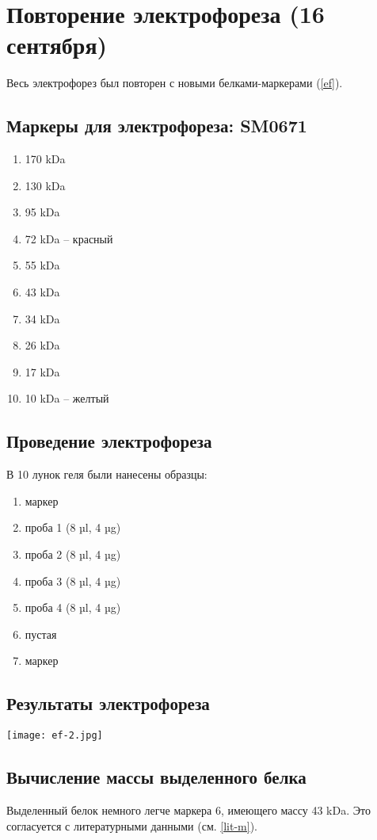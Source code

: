 \section{Повторение электрофореза (16 сентября)}

Весь электрофорез был повторен с новыми белками-маркерами (\ref{ef}).

\subsection{Маркеры для электрофореза: SM0671}
\begin{enumerate}
\item 170 kDa
\item 130 kDa
\item 95 kDa
\item 72 kDa -- красный
\item 55 kDa
\item 43 kDa
\item 34 kDa
\item 26 kDa
\item 17 kDa
\item 10 kDa -- желтый
\end{enumerate}

\subsection{Проведение электрофореза}
В 10 лунок геля были нанесены образцы:
\begin{enumerate}
\item маркер
\item проба 1 (8 µl, 4 µg)
\item проба 2 (8 µl, 4 µg)
\item проба 3 (8 µl, 4 µg)
\item проба 4 (8 µl, 4 µg)
\item пустая
\item маркер
\end{enumerate}


\subsection{Результаты электрофореза}
\texttt{[image: ef-2.jpg]}

\subsection{Вычисление массы выделенного белка}
Выделенный белок немного легче маркера 6, имеющего массу 43 kDa.
Это согласуется с литературными данными (см. \ref{lit-m}).

